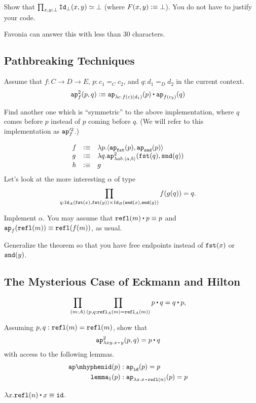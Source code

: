 \documentclass[12pt]{article}
\begin{document}
\begin{task}
  Show that $\prod_{x,y:\bot} \mathtt{Id}_\bot(x,y) \simeq \bot$
  (where $F(x,y) \vcentcolon\equiv \bot$).
  You do not have to justify your code.
  \begin{hint}
    Favonia can answer this with less than 30 characters.
  \end{hint}
\end{task}

\subsection{Pathbreaking Techniques}

Assume that $f : C \to D \to E$,
$p : c_1 =_C c_2$, and $q : d_1 =_D d_2$
in the current context.
\[
  \ap^2_f(p,q) \defeq \ap_{\lambda c.f(c)(d_1)}(p) \concat \ap_{f(c_2)}(q)
\]
\begin{task}
  \label{task:ap2prime}
  Find another one which is ``symmetric'' to the above implementation,
  where $q$ comes before $p$ instead of $p$ coming before $q$.
  (We will refer to this implementation as $\mathtt{ap}'^2_f$.)
\end{task}

\[
  \begin{array}{lcl}
    f &\vcentcolon\equiv& \lambda p.\langle \mathtt{ap}_{\mathtt{fst}}(p),\mathtt{ap}_{\mathtt{snd}}(p)\rangle
    \\
    g &\vcentcolon\equiv& \lambda q.\mathtt{ap}^2_{\lambda ab.\langle a,b\rangle}(\mathtt{fst}(q),\mathtt{snd}(q))
    \\
    h &\vcentcolon\equiv& g
  \end{array}
\]
Let's look at the more interesting $\alpha$ of type
\[
  \prod_{q : \mathtt{Id}_{A}(\mathtt{fst}(x),\mathtt{fst}(y)) \times \mathtt{Id}_B(\mathtt{snd}(x),\mathtt{snd}(y))} f(g(q)) = q.
\]
\begin{task}
  Implement $\alpha$.
  You may assume that $\refl(m) \concat p \jdeq p$ and $\mathtt{ap}_f(\mathtt{refl}(m)) \equiv \mathtt{refl}(f(m))$,
  as usual.
  \begin{hint}
    Generalize the theorem
    so that you have free endpoints instead of $\mathtt{fst}(x)$ or $\mathtt{snd}(y)$.
  \end{hint}
\end{task}

\subsection{The Mysterious Case of Eckmann and Hilton}

\[
  \prod_{(m{:}A)}\prod_{(p,q{:}\refl_A(m)=\refl_A(m))}p\concat q = q\concat p,
\]

\begin{task}
  Assuming $p, q : \mathtt{refl}(m) = \mathtt{refl}(m)$, show that
  \[
    \ap^2_{\lambda xy.x\concat y}(p,q) = p \concat q
  \]
  with access to the following lemmas.
  \begin{align*}
    \apid(p) &: \ap_{\id}(p) = p\\
    \lemmaone(p) &: \ap_{\lambda x.x\concat\refl(n)}(p) = p
  \end{align*}
  \begin{hint}
    $\lambda x.\refl(n)\concat x \jdeq \id$.
  \end{hint}
\end{task}
\end{document}
